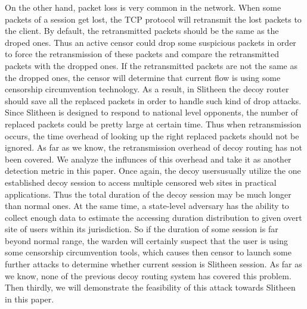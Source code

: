 \documentclass[conference]{IEEEtran}
\begin{document}
On the other hand, packet loss is very common in the network. When some packets of a session get lost, the TCP protocol will retransmit the lost packets to the client. By default, the retransmitted packets should be the same as the droped ones. Thus an active censor could drop some suspicious packets in order to force the retransmission of these packets and compare the retransmitted packets with the dropped ones. If the retransmitted packets are not the same as the dropped ones, the censor will determine that current flow is using some censorship circumvention technology. As a result, in Slitheen the decoy router should save all the replaced packets in order to handle such kind of drop attacks. Since Slitheen is designed to respond to national level opponents, the number of replaced packets could be pretty large at certain time. Thus when retransmission occurs, the time overhead of looking up the right replaced packets should not be ignored. As far as we know, the retransmission overhead of decoy routing has not been covered. We analyze the influnces of this overhead and take it as another detection metric in this paper.
Once again, the decoy usersusually utilize the one established decoy session to access multiple censored web sites in practical applications. Thus the total duration of the decoy session may be much longer than normal ones. At the same time, a state-level adversary has the ability to collect enough data to estimate the accessing duration distribution to given overt site of users within its jurisdiction. So if the duration of some session is far beyond normal range, the warden will certainly suspect that the user is using some censorship circumvention tools, which causes then censor to launch some further attacks to determine whether current session is Slitheen session. As far as we know, none of the previous decoy routing system has covered this problem. Then thirdly, we will demonstrate the feasibility of this attack towards Slitheen in this paper. 
\end{document}
